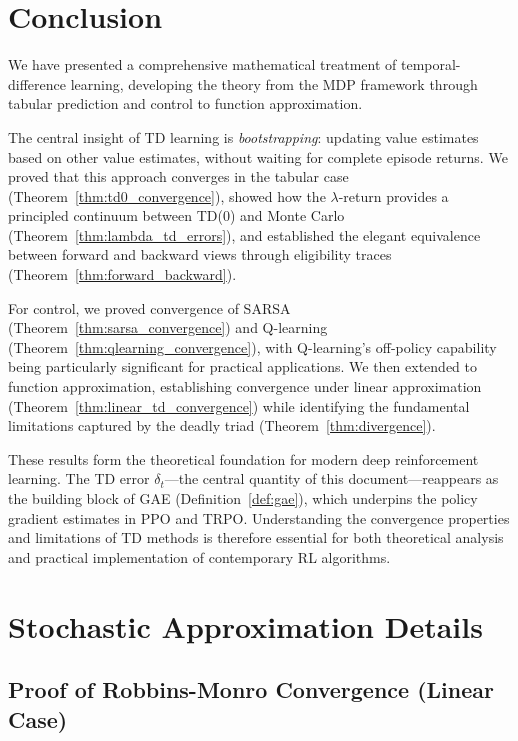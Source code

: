 \documentclass[11pt,a4paper]{article}
\theoremstyle{definition}
\theoremstyle{plain}
\theoremstyle{remark}
\begin{document}
\section{Conclusion}
\label{sec:conclusion}

We have presented a comprehensive mathematical treatment of temporal-difference learning, developing the theory from the MDP framework through tabular prediction and control to function approximation.

The central insight of TD learning is \emph{bootstrapping}: updating value estimates based on other value estimates, without waiting for complete episode returns. We proved that this approach converges in the tabular case (Theorem~\ref{thm:td0_convergence}), showed how the $\lambda$-return provides a principled continuum between TD(0) and Monte Carlo (Theorem~\ref{thm:lambda_td_errors}), and established the elegant equivalence between forward and backward views through eligibility traces (Theorem~\ref{thm:forward_backward}).

For control, we proved convergence of SARSA (Theorem~\ref{thm:sarsa_convergence}) and Q-learning (Theorem~\ref{thm:qlearning_convergence}), with Q-learning's off-policy capability being particularly significant for practical applications. We then extended to function approximation, establishing convergence under linear approximation (Theorem~\ref{thm:linear_td_convergence}) while identifying the fundamental limitations captured by the deadly triad (Theorem~\ref{thm:divergence}).

These results form the theoretical foundation for modern deep reinforcement learning. The TD error $\delta_t$---the central quantity of this document---reappears as the building block of GAE (Definition~\ref{def:gae}), which underpins the policy gradient estimates in PPO and TRPO. Understanding the convergence properties and limitations of TD methods is therefore essential for both theoretical analysis and practical implementation of contemporary RL algorithms.

\appendix

\section{Stochastic Approximation Details}
\label{app:stochastic_approx}

\subsection{Proof of Robbins-Monro Convergence (Linear Case)}
\label{app:rm_proof}
\end{document}
